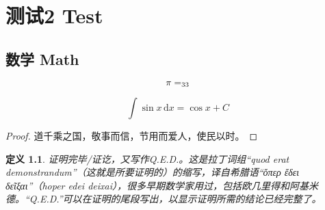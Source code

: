\documentclass[oneside]{../source/fduthesis}
\newtheorem*{proof}{证明}
\theoremstyle{plain}
\newtheorem{definition}{定义}[chapter]
\begin{document}
%
%
%

\chapter{测试2 Test}
\section{数学 Math}
\[\pi=\sb{33}\]

\[
  \int\sin x\,\mathrm{d}x=\cos x + C
\]

\begin{proof}
道千乘之国，敬事而信，节用而爱人，使民以时。
\end{proof}

\begin{definition}
证明完毕/证讫，又写作Q.E.D.。这是拉丁词组“quod erat demonstrandum”（这就是所要证明的）的缩写，译自希腊语“ὅπερ ἔδει δεῖξαι”（hoper edei deixai），很多早期数学家用过，包括欧几里得和阿基米德。“Q.E.D.”可以在证明的尾段写出，以显示证明所需的结论已经完整了。
\end{definition}
\end{document}
